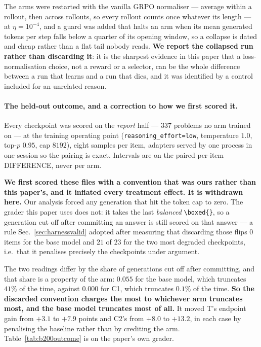 The arms were restarted with the vanilla GRPO normaliser --- average within a rollout, then
across rollouts, so every rollout counts once whatever its length --- at $\eta=10^{-4}$, and a
guard was added that halts an arm when its mean generated tokens per step falls below a
quarter of its opening window, so a collapse is dated and cheap rather than a flat tail nobody
reads. \textbf{We report the collapsed run rather than discarding it}: it is the sharpest
evidence in this paper that a loss-normalisation choice, not a reward or a selector, can be
the whole difference between a run that learns and a run that dies, and it was identified by a
control included for an unrelated reason.

\paragraph{The held-out outcome, and a correction to how we first scored it.}
Every checkpoint was scored on the \emph{report} half --- $337$ problems no arm trained on ---
at the training operating point (\texttt{reasoning\_effort=low}, temperature $1.0$, top-$p$
$0.95$, cap $8192$), eight samples per item, adapters served by one process in one session so
the pairing is exact. Intervals are on the paired per-item DIFFERENCE, never per arm.

\textbf{We first scored these files with a convention that was ours rather than this paper's,
and it inflated every treatment effect. It is withdrawn here.} Our analysis forced any
generation that hit the token cap to zero. The grader this paper uses does not: it takes the
last \emph{balanced} \verb|\boxed{}|, so a generation cut off after committing an answer is
still scored on that answer --- a rule Sec.~\ref{sec:harnessvalid} adopted after measuring
that discarding those flips $0$ items for the base model and $21$ of $23$ for the two most
degraded checkpoints, i.e.\ that it penalises precisely the checkpoints under argument.

The two readings differ by the share of generations cut off after committing, and that share
is a property of the arm: $0.055$ for the base model, which truncates $41\%$ of the time,
against $0.000$ for C1, which truncates $0.1\%$ of the time. \textbf{So the discarded
convention charges the most to whichever arm truncates most, and the base model truncates most
of all.} It moved T's endpoint gain from $+3.1$ to $+7.9$ points and C2's from $+8.0$ to
$+13.2$, in each case by penalising the baseline rather than by crediting the arm.
Table~\ref{tab:b200outcome} is on the paper's own grader.

